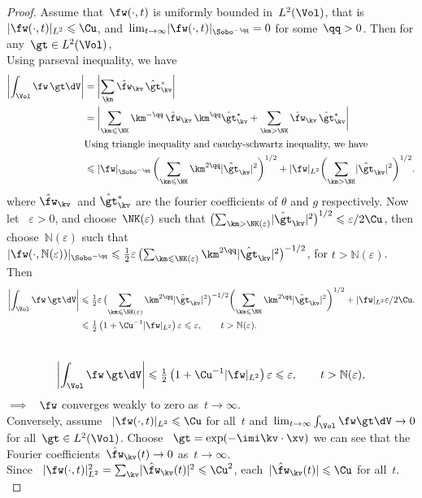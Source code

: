 \documentclass[12pt]{report}   %
\renewcommand{\le}{\leqslant}
\numberwithin{equation}{section}
\theoremstyle{plain}
\theoremstyle{definition}
\theoremstyle{remark}
\DeclarePairedDelimiter{\norm}{|}{|}
\newcommand{\eps}{{\varepsilon}}
\newcommand{\Ltnorm}[1]{\norm{#1}_{L^2}}
\renewcommand{\l}{\left}            %
\renewcommand{\r}{\right}           %
\renewcommand{\time}{t}             %
\begin{document}
\begin{proof}
Assume that~$\fw(\cdot,\time)$ is uniformly bounded in~$L^2(\Vol)$,  that is ~$\Ltnorm{\fw(\cdot,\time)} \le \Cu$, and~$\lim_{\time\rightarrow\infty}\norm{\fw(\cdot,\time)}_{\Sobo^{-\qq}} = 0$ for some~$\qq>0$.  Then for any~$\gt\in L^2(\Vol)$, \\
\vspace{0.0000001cm}
Using parseval inequality, we have
\begin{align*}
  \biggl\lvert\int_{\Vol} \fw\,\gt\dV\biggr\rvert
  & =  \biggl\lvert \sum_{\km} \hat\fw_\kv\,\hat\gt_\kv^*
    \biggr\rvert \\
  &=
  \biggl\lvert
  \sum_{\km \le \NK}
  {\km^{-\qq}}\,\hat\fw_\kv\,
  {{\km^{\qq}}}{\hat\gt_\kv^*}
  + \sum_{\km > \NK} \hat\fw_\kv\,\hat\gt_\kv^*
  \biggr\rvert \\
  &\textrm{Using triangle inequality and cauchy-schwartz inequality, we have} \\
  &\le
  \norm{\fw}_{\Sobo^{-\qq}}\,
  \biggl(\sum_{\km \le \NK}
  {\km^{2\qq}}{\lvert\hat\gt_\kv\rvert^2}\biggr)^{1/2}
  + \Ltnorm{\fw}
  \biggl(\sum_{\km > \NK} \lvert\hat\gt_\kv\rvert^2\biggr)^{1/2}.
\end{align*}
where $ \hat\fw_\kv\, $ and $\hat\gt_\kv^*$  are the fourier coefficients of $\theta$ and $g$ respectively.
\vspace{0.0001cm}
Now let ~$\eps>0$, and choose~$\NK(\eps)$ such that $\bigl(\sum_{\km >
  \NK(\eps)} \lvert\hat\gt_\kv\rvert^2\bigr)^{1/2} \le {\eps}/{2\Cu}$,
then choose~$\mathbb{N}(\eps)$ such that
$\norm{\fw(\cdot,\mathbb{N}(\eps))}_{\Sobo^{-\qq}} \le
\tfrac12\eps\,\bigl(\sum_{\km \le \NK(\eps)}
{\km^{2\qq}}{\lvert\hat\gt_\kv\rvert^2}\bigr)^{-1/2}$, for $\time >
\mathbb{N}(\eps)$.
Then
\begin{align*}
  \biggl\lvert\int_{\Vol} \fw\,\gt\dV\biggr\rvert
  & \le \tfrac12\eps\,\bigl(\sum_{\km \le \NK(\eps)}
  {\km^{2\qq}}{\lvert\hat\gt_\kv\rvert^2}\bigr)^{-1/2}  \biggl(\sum_{\km \le \NK}
    {\km^{2\qq}}{\lvert\hat\gt_\kv\rvert^2}\biggr)^{1/2}   + \Ltnorm{\fw}
     {\eps}/{2\Cu}. \\
  & \le
      \tfrac12\l(1 + \Cu^{-1}\Ltnorm{\fw}\r)\eps \le \eps,
      \qquad \time > \mathbb{N}(\eps).
\end{align*} \\
\begin{equation}
  \biggl\lvert\int_{\Vol} \fw\,\gt\dV\biggr\rvert
  \le
    \tfrac12\l(1 + \Cu^{-1}\Ltnorm{\fw}\r)\eps \le \eps,
    \qquad \time > \mathbb{N}(\eps),
\end{equation}
$\implies$ ~$\fw$ converges weakly to zero
as~$\time\rightarrow\infty$. \\
\vspace{0.0001cm}
Conversely, assume ~$\Ltnorm{\fw(\cdot,\time)} \le \Cu$ for
all~$\time$ and~$\lim_{\time\rightarrow\infty}\int_{\Vol}\fw
\gt\dV\rightarrow 0$ for all~$\gt\in L^2(\Vol)$. Choose ~$\gt=\exp(-\imi\kv\cdot\xv)$ we can see that  the Fourier
coefficients~$\hat\fw_\kv(\time)\rightarrow 0$
as~$\time\rightarrow\infty$. \\
Since ~$\Ltnorm{\fw(\cdot,\time)}^2 = \sum_\kv\lvert\hat\fw_\kv(\time)\rvert^2\le\Cu^2$, each~$\lvert\hat\fw_\kv(\time)\rvert \le \Cu$ for all~$\time$. \\


\end{proof}
\end{document}

